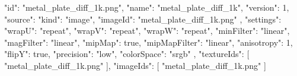 {
  "id": "metal_plate_diff_1k.png",
  "name": "metal_plate_diff_1k",
  "version": 1,
  "source": {
    "kind": "image",
    "imageId": "metal_plate_diff_1k.png"
  },
  "settings": {
    "wrapU": "repeat",
    "wrapV": "repeat",
    "wrapW": "repeat",
    "minFilter": "linear",
    "magFilter": "linear",
    "mipMap": true,
    "mipMapFilter": "linear",
    "anisotropy": 1,
    "flipY": true,
    "precision": "low",
    "colorSpace": "srgb"
  },
  "textureIds": [
    "metal_plate_diff_1k.png"
  ],
  "imageIds": [
    "metal_plate_diff_1k.png"
  ]
}
